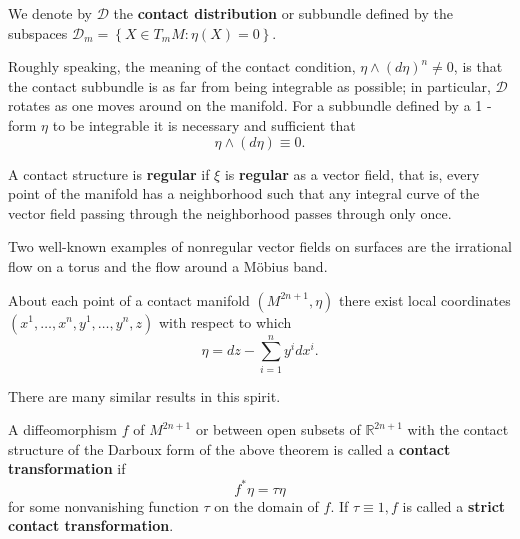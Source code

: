\begin{definition}
    We denote by $\mathcal{D}$ the \textbf{contact distribution} or subbundle defined by the subspaces $\mathcal{D}_m=\left\{X \in T_m M: \eta(X)=0\right\}$. 
\end{definition}
\begin{remark}
    Roughly speaking, the meaning of the contact condition, $\eta \wedge(d \eta)^n \neq 0$, is that the contact subbundle is as far from being integrable as possible; in particular, $\mathcal{D}$ rotates as one moves around on the manifold. For a subbundle defined by a 1 -form $\eta$ to be integrable it is necessary and sufficient that 
    \begin{equation}
        \eta \wedge(d \eta) \equiv 0. 
    \end{equation}
\end{remark}

\begin{definition}
    A contact structure is \textbf{regular} if $\xi$ is \textbf{regular} as a vector field, that is, every point of the manifold has a neighborhood such that any integral curve of the vector field passing through the neighborhood passes through only once. 
\end{definition}
\begin{remark}
    Two well-known examples of nonregular vector fields on surfaces are the irrational flow on a torus and the flow around a Möbius band.
\end{remark}

\begin{theorem}
    About each point of a contact manifold $\left(M^{2 n+1}, \eta\right)$ there exist local coordinates $\left(x^1, \ldots, x^n, y^1, \ldots, y^n, z\right)$ with respect to which
    \begin{equation}
        \eta=d z-\sum_{i=1}^n y^i d x^i.
    \end{equation}
\end{theorem}
\begin{remark}
    There are many similar results in this spirit.
\end{remark}

\begin{definition}
    A diffeomorphism $f$ of $M^{2 n+1}$ or between open subsets of $\mathbb{R}^{2 n+1}$ with the contact structure of the Darboux form of the above theorem is called a \textbf{contact transformation} if 
    \begin{equation}
        f^* \eta=\tau \eta
    \end{equation}
    for some nonvanishing function $\tau$ on the domain of $f$. If $\tau \equiv 1, f$ is called a \textbf{strict contact transformation}.
\end{definition}

